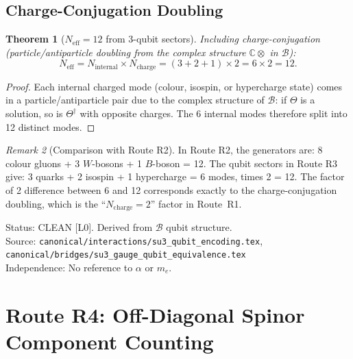 \documentclass[12pt,a4paper]{article}
\newtheorem{theorem}{Theorem}[section]
\theoremstyle{definition}
\theoremstyle{remark}
\newtheorem{remark}[theorem]{Remark}
\begin{document}
\subsection{Charge-Conjugation Doubling}
\label{ssec:neff12:R3:doubling}

\begin{theorem}[$N_{\mathrm{eff}} = 12$ from 3-qubit sectors]
\label{thm:neff12:R3}
Including charge-conjugation (particle/antiparticle doubling from the complex
structure $\mathbb{C}\otimes$ in $\mathcal{B}$):
\begin{equation}
  N_{\mathrm{eff}}
  = N_{\mathrm{internal}} \times N_{\mathrm{charge}}
  = (3 + 2 + 1) \times 2
  = 6 \times 2
  = 12.
  \label{eq:neff12:R3}
\end{equation}
\end{theorem}

\begin{proof}
Each internal charged mode (colour, isospin, or hypercharge state) comes in a
particle/antiparticle pair due to the complex structure of $\mathcal{B}$:
if $\Theta$ is a solution, so is $\Theta^\dagger$ with opposite charges.
The 6 internal modes therefore split into 12 distinct modes.
\end{proof}

\begin{remark}[Comparison with Route R2]
In Route R2, the generators are: 8 colour gluons + 3 $W$-bosons + 1 $B$-boson = 12.
The qubit sectors in Route R3 give: 3 quarks + 2 isospin + 1 hypercharge = 6 modes,
times 2 = 12.  The factor of 2 difference between 6 and 12 corresponds exactly
to the charge-conjugation doubling, which is the ``$N_{\mathrm{charge}} = 2$''
factor in Route~R1.
\end{remark}

\begin{resultbox}
Status: CLEAN [L0].  Derived from $\mathcal{B}$ qubit structure.\\
Source: \texttt{canonical/interactions/su3\_qubit\_encoding.tex},
\texttt{canonical/bridges/su3\_gauge\_qubit\_equivalence.tex}\\
Independence: No reference to $\alpha$ or $m_e$.
\end{resultbox}

\section{Route R4: Off-Diagonal Spinor Component Counting}
\label{sec:neff12:R4}
\end{document}
